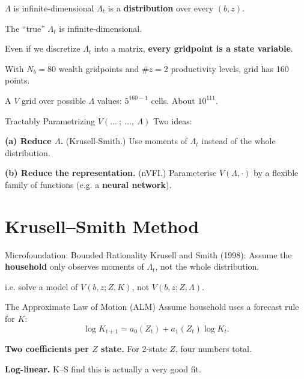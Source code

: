 \documentclass[10pt,aspectratio=169]{beamer}
\begin{document}
\begin{frame}{$\Lambda$ is infinite-dimensional}
  $\Lambda_t$ is a \textbf{distribution} over every $(b, z)$.

  The ``true'' $\Lambda_t$ is infinite-dimensional.

  Even if we discretize $\Lambda_t$ into a matrix, \textbf{every gridpoint is a state variable}.

  With $N_b = 80$ wealth gridpoints and $\#z = 2$ productivity levels, grid has 160 points.

  A $V$ grid over possible $\Lambda$ values: $5^{160-1}$ cells. About $10^{111}$.
\end{frame}

\begin{frame}{Tractably Parametrizing $V(\ldots\ ;\ \ldots,\ \Lambda)$}
  Two ideas:

  \textbf{(a) Reduce $\Lambda$.} (Krusell-Smith.) Use moments of $\Lambda_t$ instead of the whole distribution.

  \textbf{(b) Reduce the representation.} (nVFI.) Parameterise $V(\Lambda, \cdot)$ by a flexible family of functions (e.g. a \textbf{neural network}).
\end{frame}

\section[K--S Method]{Krusell--Smith Method}

\begin{frame}{Microfoundation: Bounded Rationality}
  Krusell and Smith (1998): Assume the \textbf{household} only observes moments of $\Lambda_t$, not the whole distribution.

  i.e. solve a model of $V(b, z; Z, K)$, not $V(b, z; Z, \Lambda)$.
\end{frame}

\begin{frame}{The Approximate Law of Motion (ALM)}
  Assume household uses a forecast rule for $K$:
  \[
    \log K_{t+1} = a_0(Z_t) + a_1(Z_t) \log K_t.
  \]

  \textbf{Two coefficients per $Z$ state.} For 2-state $Z$, four numbers total.

  \textbf{Log-linear.} K--S find this is actually a very good fit.
\end{frame}
\end{document}
